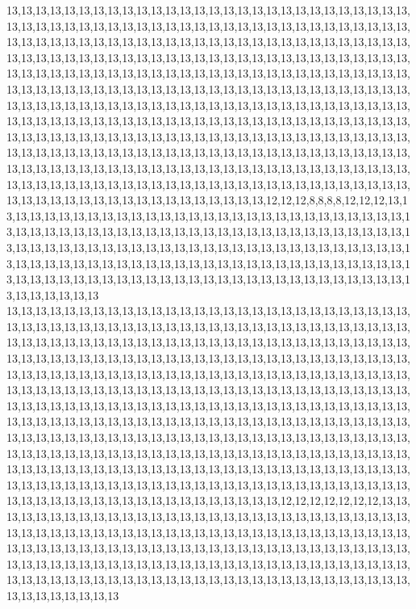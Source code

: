 13,13,13,13,13,13,13,13,13,13,13,13,13,13,13,13,13,13,13,13,13,13,13,13,13,13,13,13,13,13,13,13,13,13,13,13,13,13,13,13,13,13,13,13,13,13,13,13,13,13,13,13,13,13,13,13,13,13,13,13,13,13,13,13,13,13,13,13,13,13,13,13,13,13,13,13,13,13,13,13,13,13,13,13,13,13,13,13,13,13,13,13,13,13,13,13,13,13,13,13,13,13,13,13,13,13,13,13,13,13,13,13,13,13,13,13,13,13,13,13,13,13,13,13,13,13,13,13,13,13,13,13,13,13,13,13,13,13,13,13,13,13,13,13,13,13,13,13,13,13,13,13,13,13,13,13,13,13,13,13,13,13,13,13,13,13,13,13,13,13,13,13,13,13,13,13,13,13,13,13,13,13,13,13,13,13,13,13,13,13,13,13,13,13,13,13,13,13,13,13,13,13,13,13,13,13,13,13,13,13,13,13,13,13,13,13,13,13,13,13,13,13,13,13,13,13,13,13,13,13,13,13,13,13,13,13,13,13,13,13,13,13,13,13,13,13,13,13,13,13,13,13,13,13,13,13,13,13,13,13,13,13,13,13,13,13,13,13,13,13,13,13,13,13,13,13,13,13,13,13,13,13,13,13,13,13,13,13,13,13,13,13,13,13,13,13,13,13,13,13,13,13,13,13,13,13,13,13,13,13,13,13,13,13,13,13,13,13,13,13,13,13,13,13,13,13,13,13,13,13,13,13,13,13,13,13,13,13,13,13,13,13,13,13,13,13,13,13,13,13,13,13,13,13,12,12,12,8,8,8,8,12,12,12,13,13,13,13,13,13,13,13,13,13,13,13,13,13,13,13,13,13,13,13,13,13,13,13,13,13,13,13,13,13,13,13,13,13,13,13,13,13,13,13,13,13,13,13,13,13,13,13,13,13,13,13,13,13,13,13,13,13,13,13,13,13,13,13,13,13,13,13,13,13,13,13,13,13,13,13,13,13,13,13,13,13,13,13,13,13,13,13,13,13,13,13,13,13,13,13,13,13,13,13,13,13,13,13,13,13,13,13,13,13,13,13,13,13,13,13,13,13,13,13,13,13,13,13,13,13,13,13,13,13,13,13,13,13,13,13,13,13,13,13,13,13,13,13,13,13,13,13
13,13,13,13,13,13,13,13,13,13,13,13,13,13,13,13,13,13,13,13,13,13,13,13,13,13,13,13,13,13,13,13,13,13,13,13,13,13,13,13,13,13,13,13,13,13,13,13,13,13,13,13,13,13,13,13,13,13,13,13,13,13,13,13,13,13,13,13,13,13,13,13,13,13,13,13,13,13,13,13,13,13,13,13,13,13,13,13,13,13,13,13,13,13,13,13,13,13,13,13,13,13,13,13,13,13,13,13,13,13,13,13,13,13,13,13,13,13,13,13,13,13,13,13,13,13,13,13,13,13,13,13,13,13,13,13,13,13,13,13,13,13,13,13,13,13,13,13,13,13,13,13,13,13,13,13,13,13,13,13,13,13,13,13,13,13,13,13,13,13,13,13,13,13,13,13,13,13,13,13,13,13,13,13,13,13,13,13,13,13,13,13,13,13,13,13,13,13,13,13,13,13,13,13,13,13,13,13,13,13,13,13,13,13,13,13,13,13,13,13,13,13,13,13,13,13,13,13,13,13,13,13,13,13,13,13,13,13,13,13,13,13,13,13,13,13,13,13,13,13,13,13,13,13,13,13,13,13,13,13,13,13,13,13,13,13,13,13,13,13,13,13,13,13,13,13,13,13,13,13,13,13,13,13,13,13,13,13,13,13,13,13,13,13,13,13,13,13,13,13,13,13,13,13,13,13,13,13,13,13,13,13,13,13,13,13,13,13,13,13,13,13,13,13,13,13,13,13,13,13,13,13,13,13,13,13,13,13,13,13,13,13,13,13,13,13,13,13,13,13,13,13,13,13,13,12,12,12,12,12,12,12,13,13,13,13,13,13,13,13,13,13,13,13,13,13,13,13,13,13,13,13,13,13,13,13,13,13,13,13,13,13,13,13,13,13,13,13,13,13,13,13,13,13,13,13,13,13,13,13,13,13,13,13,13,13,13,13,13,13,13,13,13,13,13,13,13,13,13,13,13,13,13,13,13,13,13,13,13,13,13,13,13,13,13,13,13,13,13,13,13,13,13,13,13,13,13,13,13,13,13,13,13,13,13,13,13,13,13,13,13,13,13,13,13,13,13,13,13,13,13,13,13,13,13,13,13,13,13,13,13,13,13,13,13,13,13,13,13,13,13,13,13,13,13,13,13,13,13,13,13,13
